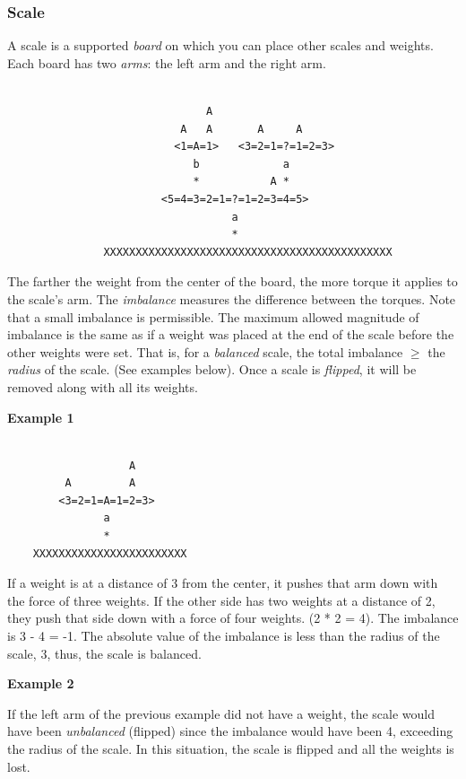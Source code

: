 \documentclass[12pt]{article}
\begin{document}
\subsubsection{Scale}
A scale is a supported \textit{board} on which you can place other scales and
weights. Each board has two \textit{arms}: the left arm and the right arm.
\begin{verbatim}

                               A
                           A   A       A     A
                          <1=A=1>   <3=2=1=?=1=2=3>
                             b             a
                             *           A *
                        <5=4=3=2=1=?=1=2=3=4=5>
                                   a
                                   *
               XXXXXXXXXXXXXXXXXXXXXXXXXXXXXXXXXXXXXXXXXXXXX
\end{verbatim}

The farther the weight from the center of the board, the more torque it applies
to the scale's arm. The \textit{imbalance} measures the difference between the
torques. Note that a small imbalance is permissible. The maximum allowed
magnitude of imbalance is the same as if a weight was placed at the end of the
scale before the other weights were set. That is, for a \textit{balanced} scale,
the total imbalance $\geq$ the \textit{radius} of the scale. (See examples
below).  Once a scale is \textit{flipped}, it will be removed along with all its
weights.

\newpage
\textbf{Example 1}
\begin{verbatim}

                   A
         A         A
        <3=2=1=A=1=2=3>
               a
               *
    XXXXXXXXXXXXXXXXXXXXXXXX
\end{verbatim}

If a weight is at a distance of 3 from the center, it pushes that
arm down with the force of three weights. If the other side has two weights at
a distance of 2, they push that side down with a force of four weights. (2 * 2
= 4). The imbalance is 3 - 4 = -1. The absolute value of the imbalance is less
than the radius of the scale, 3, thus, the scale is balanced.

\textbf{Example 2}

If the left arm of the previous example did not have a weight, the scale would
have been \textit{unbalanced} (flipped) since the imbalance would have been 4,
exceeding the radius of the scale. In this situation, the scale is flipped and
all the weights is lost.  
\end{document}
